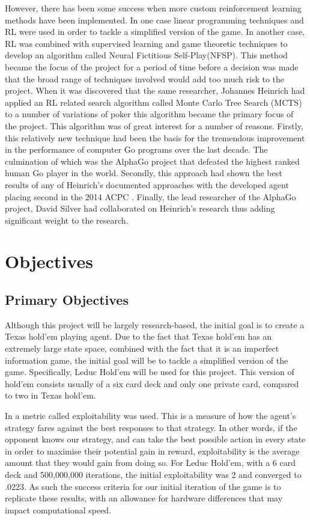 However, there has been some success when more custom reinforcement learning methods have been implemented.
In one case linear programming techniques and RL were used in order to tackle a
simplified version of the game\citep{dahl2001reinforcement}.
In another case, RL was combined with supervised learning and game theoretic
techniques\citep{heinrich2016deep} to develop an algorithm called Neural Fictitious Self-Play(NFSP).
This method became the focus of the project for a period of time before a decision was made
that the broad range of techniques involved would add too much risk to the project.
When it was discovered that the same researcher, Johannes Heinrich had applied an RL related search
algorithm called Monte Carlo Tree Search (MCTS) to a number of variations of poker\citep{heinrich2015smooth}
this algorithm became the primary focus of the project.
This algorithm was of great interest for a number of reasons.
Firstly, this relatively new technique had been the basis for the tremendous improvement in the
performance of computer Go programs over the last decade.
The culmination of which was the AlphaGo project that defeated the highest ranked human Go player in
the world\citep{silver2016mastering}.
Secondly, this approach had shown the best results of any of Heinrich's documented approaches
with the developed agent placing second in the 2014 ACPC .
Finally, the lead researcher of the AlphaGo project, David Silver had collaborated on Heinrich's
research thus adding significant weight to the research.


\section{Objectives}\label{sec:objectives}
\subsection{Primary Objectives}\label{subsec:primaryObjectives}

Although this project will be largely research-based, the initial goal is to create a Texas hold'em
playing agent.
Due to the fact that Texas hold'em has an extremely large state space, combined with the fact that it
is an imperfect information game, the initial goal will be to tackle a simplified version of the game.
Specifically, Leduc Hold'em will be used for this project.
This version of hold'em consists usually of a six card deck and only one private card, compared to two in Texas hold'em.

In\citep{heinrich2015smooth} a metric called exploitability was used.
This is a measure of how the agent's strategy fares against the best responses to that strategy.
In other words, if the opponent knows our strategy, and can take the best possible action
in every state in order to maximise their potential gain in reward, exploitability is the average amount
that they would gain from doing so.
For Leduc Hold'em, with a 6 card deck and 500,000,000 iterations, the initial exploitability was 2 and converged
to .0223.
As such the success criteria for our initial iteration of the game is to replicate these results, with an
allowance for hardware differences that may impact computational speed.

